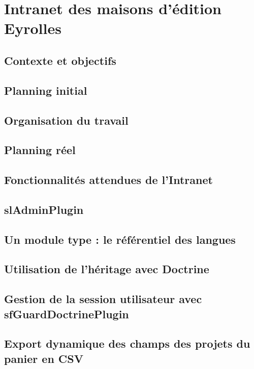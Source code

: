\section{Intranet des maisons d'édition Eyrolles}

\subsection{Contexte et objectifs}

\subsection{Planning initial}

\subsection{Organisation du travail}

\subsection{Planning réel}

\subsection{Fonctionnalités attendues de l'Intranet}

\subsection{slAdminPlugin}

\subsection{Un module type : le référentiel des langues}

\subsection{Utilisation de l'héritage avec Doctrine}

\subsection{Gestion de la session utilisateur avec sfGuardDoctrinePlugin}

\subsection{Export dynamique des champs des projets du panier en CSV}

